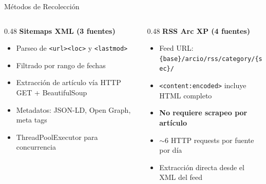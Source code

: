\documentclass[11pt,aspectratio=169,spanish]{beamer}
\begin{document}
\begin{frame}{Métodos de Recolección}
    \begin{columns}[T]
        \begin{column}{0.48\textwidth}
            \textbf{Sitemaps XML (3 fuentes)}
            \begin{itemize}
                \item Parseo de \texttt{<url><loc>} y \texttt{<lastmod>}
                \item Filtrado por rango de fechas
                \item Extracción de artículo vía HTTP GET + BeautifulSoup
                \item Metadatos: JSON-LD, Open Graph, meta tags
                \item ThreadPoolExecutor para concurrencia
            \end{itemize}
        \end{column}
        \begin{column}{0.48\textwidth}
            \textbf{RSS Arc XP (4 fuentes)}
            \begin{itemize}
                \item Feed URL: \texttt{\{base\}/arcio/rss/category/\{sec\}/}
                \item \texttt{<content:encoded>} incluye HTML completo
                \item \textbf{No requiere scrapeo por artículo}
                \item $\sim$6 HTTP requests por fuente por día
                \item Extracción directa desde el XML del feed
            \end{itemize}
        \end{column}
    \end{columns}


\end{frame}
\end{document}
